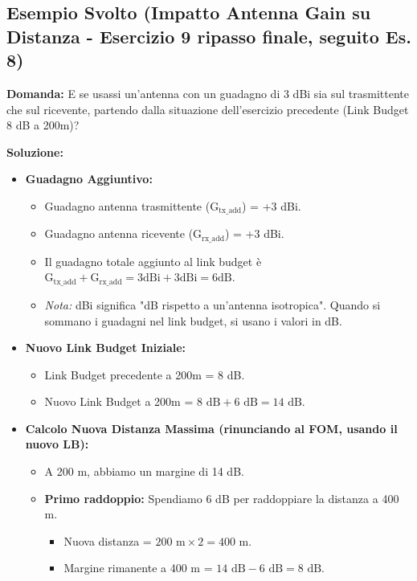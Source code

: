 \subsection{Esempio Svolto (Impatto Antenna Gain su Distanza - Esercizio 9 ripasso finale, seguito Es. 8)}
\textbf{Domanda:} E se usassi un'antenna con un guadagno di 3 dBi sia sul trasmittente che sul ricevente, partendo dalla situazione dell'esercizio precedente (Link Budget 8 dB a 200m)?

\textbf{Soluzione:}
\begin{itemize}
    \item \textbf{Guadagno Aggiuntivo:}
    \begin{itemize}
        \item Guadagno antenna trasmittente ($\text{G}_{\text{tx\_add}}$) = +3 dBi.
        \item Guadagno antenna ricevente ($\text{G}_{\text{rx\_add}}$) = +3 dBi.
        \item Il guadagno totale aggiunto al link budget è $\text{G}_{\text{tx\_add}} + \text{G}_{\text{rx\_add}} = 3\text{dBi} + 3\text{dBi} = 6\text{dB}$.
        \item \textit{Nota:} dBi significa "dB rispetto a un'antenna isotropica". Quando si sommano i guadagni nel link budget, si usano i valori in dB.
    \end{itemize}
    \item \textbf{Nuovo Link Budget Iniziale:}
    \begin{itemize}
        \item Link Budget precedente a 200m = 8 dB.
        \item Nuovo Link Budget a 200m = $8 \text{ dB} + 6 \text{ dB} = 14 \text{ dB}$.
    \end{itemize}
    \item \textbf{Calcolo Nuova Distanza Massima (rinunciando al FOM, usando il nuovo LB):}
    \begin{itemize}
        \item A 200 m, abbiamo un margine di 14 dB.
        \item \textbf{Primo raddoppio:} Spendiamo 6 dB per raddoppiare la distanza a 400 m.
        \begin{itemize}
            \item Nuova distanza = $200 \text{ m} \times 2 = 400 \text{ m}$.
            \item Margine rimanente a 400 m = $14 \text{ dB} - 6 \text{ dB} = 8 \text{ dB}$.
        \end{itemize}

\end{itemize}
\end{itemize}
